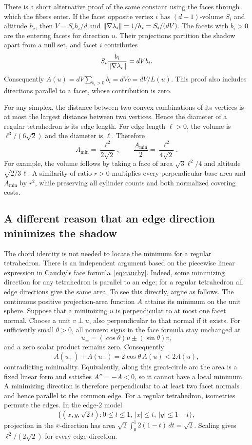 \label{par:entering-faces}
There is a short alternative proof of the same constant using the
faces through which the fibers enter. If the facet opposite vertex $i$
has $(d-1)$-volume $S_i$ and altitude $h_i$, then
$V=S_i h_i/d$ and $\lVert\nabla\lambda_i\rVert=1/h_i=S_i/(dV)$.
The facets with $b_i>0$ are the entering facets for direction $u$.
Their projections partition the shadow apart from a null set, and
facet $i$ contributes
\[
 S_i\frac{b_i}{\lVert\nabla\lambda_i\rVert}=dVb_i.
\]
Consequently $A(u)=dV\sum_{b_i>0}b_i=dVc=dV/L(u)$.
This proof also includes directions parallel to a facet, whose
contribution is zero.

For any simplex, the distance between two convex combinations of its
vertices is at most the largest distance between two vertices. Hence the
diameter of a regular tetrahedron is its edge length. For edge length
$\ell>0$, the volume is
$\ell^3/(6\sqrt2)$ and the diameter is $\ell$. Therefore
\begin{equation}\label{eq:regular-normalization}
 A_{\min}=\frac{\ell^2}{2\sqrt2},\qquad
 \frac{A_{\min}}2=\frac{\ell^2}{4\sqrt2}.
\end{equation}
For example, the volume follows by taking a face of area
$\sqrt3\ell^2/4$ and altitude $\sqrt{2/3}\ell$.
A similarity of ratio $r>0$ multiplies every perpendicular base area
and $A_{\min}$ by $r^2$, while preserving all cylinder counts and
both normalized covering costs.

\subsection{A different reason that an edge direction minimizes the shadow}

The chord identity is not needed to locate the minimum for a regular
tetrahedron. There is an independent argument based on the piecewise
linear expression in Cauchy's face formula~\eqref{eq:cauchy}.
Indeed, some minimizing direction for any tetrahedron is parallel to an
edge; for a regular tetrahedron all edge directions give the same area.
To see this directly, argue as follows.
The continuous positive projection-area function $A$ attains its
minimum on the unit sphere. Suppose that a minimizing $u$ is
perpendicular to at most one facet normal. Choose a unit $v\perp u$,
also perpendicular to that normal if it exists. For sufficiently small
$\theta>0$, all nonzero signs in the face formula stay unchanged at
\[
 u_\pm=(\cos\theta)u\pm(\sin\theta)v,
\]
and a zero scalar product remains zero. Consequently
\[
 A(u_+)+A(u_-)=2\cos\theta\,A(u)<2A(u),
\]
contradicting minimality. Equivalently, along this great-circle arc the
area is a fixed linear form and satisfies $A''=-A<0$, so it cannot
have a local minimum. A minimizing direction is therefore perpendicular
to at least two facet normals and hence parallel to the common edge.
For a regular tetrahedron, isometries permute the edges. In the edge-$2$
model
\[
 \{(x,y,\sqrt2 t):0\le t\le1,\ |x|\le t,\ |y|\le1-t\},
\]
projection in the $x$-direction has area
$\sqrt2\int_0^1 2(1-t)\,dt=\sqrt2$. Scaling gives
$\ell^2/(2\sqrt2)$ for every edge direction.

